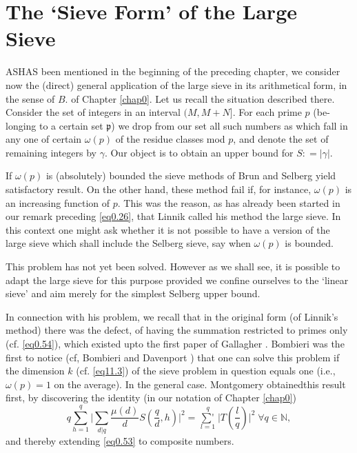 
\chapter{The `Sieve Form' of the Large Sieve}\label{chap7}%
 
AS\pageoriginale HAS been mentioned in the beginning of the preceding
chapter, we consider now the (direct) general application of the large
sieve in its arithmetical form, in the sense of $B$. of Chapter
\ref{chap0}. Let us recall the situation described there. Consider the set of
integers in an  interval $(M, M+N]$. For each prime $p$ (be-longing
  to a certain 
  set $\mathfrak{p}$) we drop from our set all such numbers as which
  fall in any one of certain $\omega (p)$ of the residue classes mod
  $p$, and denote the set of remaining integers by $\gamma$. Our
  object is to obtain an upper bound for $S: = |\gamma |$.   
 
If $\omega (p)$ is (absolutely) bounded the sieve methods of Brun and
Selberg yield satisfactory result. On the other hand, these method
fail if, for instance, $\omega (p)$ is an increasing function of
$p$. This was the reason, as has already been started in our remark
preceding \eqref{eq0.26}, that Linnik called his method the large sieve. In
this context one might ask whether it is not possible to have a
version of the large sieve which shall include the Selberg sieve, say
when $\omega(p)$ is bounded. 
 
This problem has not yet been solved. However as we shall see, it is
possible to adapt the large sieve for this purpose provided we
confine ourselves to the `linear sieve' and aim merely for the
simplest Selberg upper bound. 
 
 In connection with his problem, we recall that in the original form
 (of Linnik's method) there was the defect, of having the summation
 restricted to primes only (cf. \eqref{eq0.54}), which existed upto
 the first  paper of Gallagher \cite{key1}. 
 Bombieri was the first to notice (cf,
 Bombieri and Davenport \cite{key2}) that one can solve this problem if the
 dimension $k$ (cf. \eqref{eq11.3}) of the sieve problem in question equals
 one (i.e., $\omega (p) = 1$ on the average). In the general
 case. Montgomery \cite{key1} obtained\pageoriginale this result first, by
 discovering the identity (in our notation of Chapter \ref{chap0}) 
\begin{equation}
q \sum^q_{h=1}\Big|\sum _{d|q} \frac{\mu (d)}{d}
S(\frac{q}{d},h)\Big|^2 = \mathop{\sum{}'}\limits^{q}_{l=1}\Big|
T(\frac{l}{q})\Big|^2 
\; \forall q \in \mathbb{N}, \tag{7.1}\label{eq7.1} 
\end{equation}
and thereby extending \eqref{eq0.53} to composite numbers.

